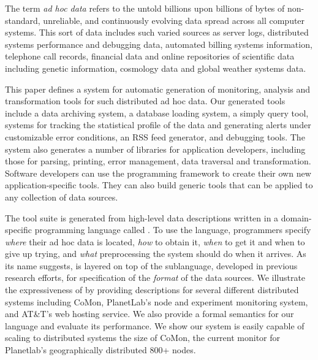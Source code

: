 The term {\em ad hoc data} refers to the untold billions upon billions of bytes
of non-standard, unreliable, and continuously evolving data spread
across all computer systems.  This sort of data includes such varied
sources as server logs, distributed systems performance and
debugging data, automated billing systems information, telephone call
records, financial data and online repositories of scientific data
including genetic information, cosmology data and global weather
systems data.

This paper defines a system for automatic generation of monitoring,
analysis and transformation tools for such distributed ad hoc data.
Our generated tools include a data archiving system, a database loading
system, a simply query tool, systems for tracking the statistical profile of the data and
generating alerts under customizable error conditions, an RSS feed
generator, and debugging tools.  The system also generates a
number of libraries for application developers, including those for
parsing, printing, error management, data traversal and
transformation.  Software developers can use the programming framework
to create their own new application-specific tools.  They can also build
generic tools that can be applied to any collection of data sources.

The tool suite is generated from high-level data descriptions
written in a domain-specific programming language called \padsd{}.  To
use the language, programmers specify {\em where} their ad hoc data is
located, {\em how} to obtain it, {\em when} to get it and when
to give up trying, and {\em what}
preprocessing the system should do when it arrives.  As its name suggests,
\padsd{} is layered on top of the \pads{} sublanguage, developed in
previous research efforts, for specification of the {\em format} of
the data sources.  We illustrate the expressiveness of \padsd{} by
providing descriptions for several different distributed systems
including CoMon, PlanetLab's node and experiment monitoring system,
and AT\&T's web hosting service.  We also provide a formal semantics for
our language and evaluate its performance.  We show our system is
easily capable of scaling to distributed systems the size of CoMon,
the current monitor for Planetlab's geographically distributed 800+ nodes.



